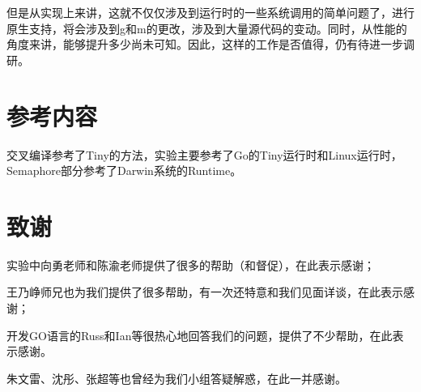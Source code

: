 \documentclass{article}
\begin{document}
但是从实现上来讲，这就不仅仅涉及到运行时的一些系统调用的简单问题了，进行原生支持，将会涉及到g和m的更改，涉及到大量源代码的变动。同时，从性能的角度来讲，能够提升多少尚未可知。因此，这样的工作是否值得，仍有待进一步调研。

\section{参考内容}

交叉编译参考了Tiny的方法，实验主要参考了Go的Tiny运行时和Linux运行时，Semaphore部分参考了Darwin系统的Runtime。

\section{致谢}
实验中向勇老师和陈渝老师提供了很多的帮助（和督促），在此表示感谢；

王乃峥师兄也为我们提供了很多帮助，有一次还特意和我们见面详谈，在此表示感谢；

开发GO语言的Russ和Ian等很热心地回答我们的问题，提供了不少帮助，在此表示感谢。

朱文雷、沈彤、张超等也曾经为我们小组答疑解惑，在此一并感谢。
\end{document}
